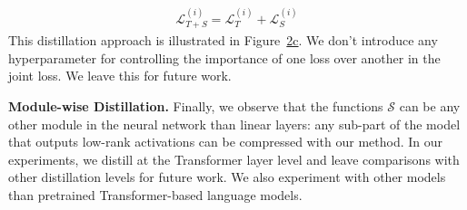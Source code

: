 \documentclass[11pt]{article}
\newcommand{\myparagraph}[1]{\noindent\textbf{#1}}
\begin{document}
\begingroup
\setlength{\abovedisplayskip}{0pt}
\setlength{\belowdisplayskip}{3pt}
{\small{
\begin{align}
    \label{eq:teacher+student}
    \mathcal{L}^{(i)}_{T+S} = \mathcal{L}^{(i)}_{T} + \mathcal{L}^{(i)}_{S}
\end{align}
}}
\endgroup
This distillation approach is illustrated in Figure~\hyperref[fig:teacher_student]{2c}. We don't introduce any hyperparameter for controlling the importance of one loss over another in the joint loss. We leave this for future work.

\myparagraph{Module-wise Distillation.} Finally, we observe that the functions
$\mathcal{S}$ can be any other module in the neural network than linear
layers: any sub-part of the model that outputs low-rank activations can be
compressed with our method. In our experiments, we distill at the Transformer
layer level and leave comparisons with other distillation levels for future
work. We also experiment with other models than pretrained
Transformer-based language models.
\end{document}
